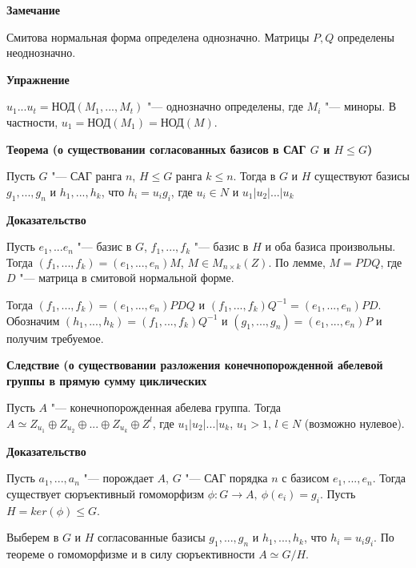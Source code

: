 \documentclass{article}
\begin{document}
\vspace{5pt}

\textbf{Замечание}

Смитова нормальная форма определена однозначно. Матрицы $P, Q$ определены неоднозначно.

\vspace{5pt}

\textbf{Упражнение}

$u_1...u_t = $НОД$(M_1, ..., M_t)$ "--- однозначно определены, где $M_i$ "--- миноры. В частности, $u_1 = $НОД$(M_1) = $НОД$(M)$.

\vspace{10pt}

\textbf{Теорема (о существовании согласованных базисов в САГ $G$ и $H \leq G$)}

Пусть $G$ "--- САГ ранга $n$, $H \leq G$ ранга $k \leq n$. Тогда в $G$ и $H$ существуют базисы $g_1, ..., g_n$ и $h_1, ..., h_k$, что $h_i = u_ig_i$, где $u_i \in N$ и $u_1 | u_2 | ... | u_k$

\vspace{5pt}

\textbf{Доказательство}

Пусть $e_1, ... e_n$ "--- базис в $G$, $f_1, ..., f_k$ "--- базис в $H$ и оба базиса произвольны. Тогда $(f_1, ..., f_k) = (e_1, ..., e_n)M$, $M \in M_{n \times k}(Z)$. По лемме, $M = PDQ$, где $D$ "--- матрица в смитовой нормальной форме. 

Тогда $(f_1, ..., f_k) = (e_1, ..., e_n)PDQ$ и $(f_1, ..., f_k)Q^{-1} = (e_1, ..., e_n)PD$. Обозначим $(h_1, ..., h_k) = (f_1, ..., f_k)Q^{-1}$ и $(g_1, ..., g_n) = (e_1, ..., e_n)P$ и получим требуемое.

\vspace{10pt}

\textbf{Следствие (о существовании разложения конечнопорожденной абелевой группы в прямую сумму циклических}

Пусть $A$ "--- конечнопорожденная абелева группа. Тогда $A \simeq Z_{u_1} \oplus Z_{u_2} \oplus ...  \oplus Z_{u_k} \oplus Z^l$, где $u_1 | u_2 | ... | u_k$, $u_1 > 1$, $l \in N$ (возможно нулевое).

\textbf{Доказательство}

Пусть $a_1, ..., a_n$ "--- порождает $A$, $G$ "--- САГ порядка $n$ с базисом $e_1, ..., e_n$. Тогда существует сюръективный гомоморфизм $\phi: G \rightarrow A, \ \phi(e_i) = g_i$. Пусть $H = ker(\phi) \leq G$.

Выберем в $G$ и $H$ согласованные базисы $g_1, ..., g_n$ и $h_1, ..., h_k$, что $h_i = u_ig_i$. По теореме о гомоморфизме и в силу сюръективности $A \simeq G / H$.
\end{document}
